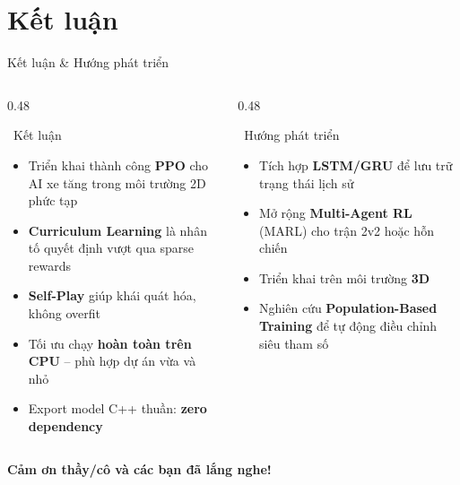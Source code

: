 \documentclass[aspectratio=169, 11pt]{beamer}
\begin{document}
\section{Kết luận}

\begin{frame}{Kết luận \& Hướng phát triển}
  \begin{columns}[T]
    \begin{column}{0.48\textwidth}
      \begin{block}{\faCheckCircle~Kết luận}
        \begin{itemize}
          \item Triển khai thành công \textbf{PPO} cho AI xe tăng trong môi trường 2D phức tạp
          \item \textbf{Curriculum Learning} là nhân tố quyết định vượt qua sparse rewards
          \item \textbf{Self-Play} giúp khái quát hóa, không overfit
          \item Tối ưu chạy \textbf{hoàn toàn trên CPU} -- phù hợp dự án vừa và nhỏ
          \item Export model C++ thuần: \textbf{zero dependency}
        \end{itemize}
      \end{block}
    \end{column}
    \begin{column}{0.48\textwidth}
      \begin{block}{\faRocket~Hướng phát triển}
        \begin{itemize}
          \item Tích hợp \textbf{LSTM/GRU} để lưu trữ trạng thái lịch sử
          \item Mở rộng \textbf{Multi-Agent RL} (MARL) cho trận 2v2 hoặc hỗn chiến
          \item Triển khai trên môi trường \textbf{3D}
          \item Nghiên cứu \textbf{Population-Based Training} để tự động điều chỉnh siêu tham số
        \end{itemize}
      \end{block}
    \end{column}
  \end{columns}

  \vspace{8pt}
  \begin{center}
    \Large\bfseries\color{mainblue} Cảm ơn thầy/cô và các bạn đã lắng nghe!
  \end{center}
\end{frame}
\end{document}
